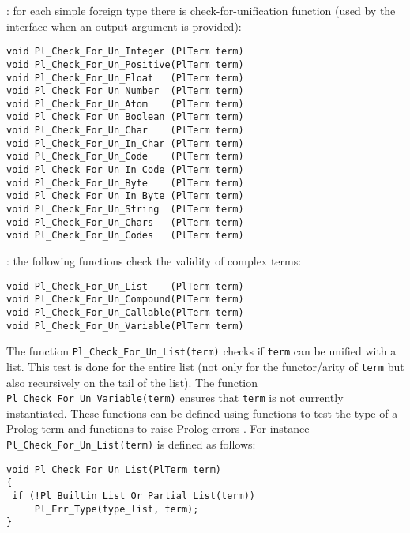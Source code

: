 : for each simple foreign type
 there is check-for-unification function (used
by the interface when an output argument is provided):

\begin{Indentation}
\begin{verbatim}
void Pl_Check_For_Un_Integer (PlTerm term)
void Pl_Check_For_Un_Positive(PlTerm term)
void Pl_Check_For_Un_Float   (PlTerm term)
void Pl_Check_For_Un_Number  (PlTerm term)
void Pl_Check_For_Un_Atom    (PlTerm term)
void Pl_Check_For_Un_Boolean (PlTerm term)
void Pl_Check_For_Un_Char    (PlTerm term)
void Pl_Check_For_Un_In_Char (PlTerm term)
void Pl_Check_For_Un_Code    (PlTerm term)
void Pl_Check_For_Un_In_Code (PlTerm term)
void Pl_Check_For_Un_Byte    (PlTerm term)
void Pl_Check_For_Un_In_Byte (PlTerm term)
void Pl_Check_For_Un_String  (PlTerm term)
void Pl_Check_For_Un_Chars   (PlTerm term)
void Pl_Check_For_Un_Codes   (PlTerm term)
\end{verbatim}
\end{Indentation}

: the following functions check the validity of
complex terms:

\begin{Indentation}
\begin{verbatim}
void Pl_Check_For_Un_List    (PlTerm term)
void Pl_Check_For_Un_Compound(PlTerm term)
void Pl_Check_For_Un_Callable(PlTerm term)
void Pl_Check_For_Un_Variable(PlTerm term)
\end{verbatim}
\end{Indentation}

The function \texttt{Pl\_Check\_For\_Un\_List(term)} checks if \texttt{term} can
be unified with a list. This test is done for the entire list (not only for
the functor/arity of \texttt{term} but also recursively on the tail of the
list). The function \texttt{Pl\_Check\_For\_Un\_Variable(term)} ensures that
\texttt{term} is not currently instantiated. These functions can be defined
using functions to test the type of a Prolog term  and functions to raise Prolog errors . For instance \texttt{Pl\_Check\_For\_Un\_List(term)} is defined
as follows:

\begin{Indentation}
\begin{verbatim}
void Pl_Check_For_Un_List(PlTerm term)
{
 if (!Pl_Builtin_List_Or_Partial_List(term))
     Pl_Err_Type(type_list, term);
}
\end{verbatim}
\end{Indentation}

